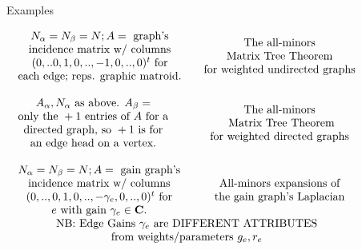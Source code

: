 \documentclass{beamer}
\begin{document}
\begin{frame}{Examples}
  
 \hspace*{-0.25in}$
  \begin{array}{lc}
    \begin{array}{c}
      N_\alpha=N_\beta=N; A = \text{\ graph's}\\
      \text{incidence matrix w/ columns}\\
      (0,..0,1,0,..,-1,0,..,0)^t\text{ for}\\
      \text{each edge; reps. graphic matroid.}
    \end{array}
    &
    \begin{array}{c}
      \text{The all-minors}\\
      \text{Matrix Tree Theorem}\\
    \text{for weighted undirected graphs}
    \end{array}
    \\ \\
    \begin{array}{c}
      A_\alpha, N_\alpha \text{ as above. }A_\beta=\\
      \text{only the\ } +1\text{\ entries of\ }A\text{ for a}\\
      \text{directed graph, so }+1\text{\ is for}\\
      \text{an edge head on a vertex.}\\
    \end{array}
    &
    \begin{array}{c}
      \text{The all-minors}\\
      \text{ Matrix Tree Theorem} \\
    \text{for weighted directed graphs}
    \end{array}
  \\ \\
    \begin{array}{c}
      N_\alpha=N_\beta=N; A = \text{\ gain graph's}\\
      \text{incidence matrix w/ columns}\\
      (0,..,0,1,0,..,-\gamma_e,0,..,0)^t\text{ for}\\
      e\text{ with gain } \gamma_e \in \mathbf{C}.
    \end{array}
    &
    \begin{array}{c}
      \text{All-minors expansions of}\\
      \text{the gain graph's Laplacian}
    \end{array}\\
    \multicolumn{2}{c}{\text{NB: Edge Gains\ }\gamma_e\text{\ are DIFFERENT ATTRIBUTES}}\\
    \multicolumn{2}{c}{\text{from weights/parameters\ }g_e,r_e}
  \end{array}
  $
\end{frame}
\end{document}
